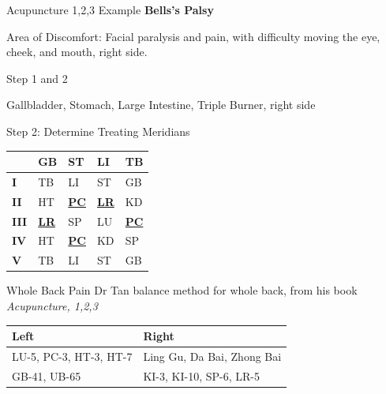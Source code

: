 \documentclass{beamer}
\begin{document}
\begin{frame}{Acupuncture 1,2,3 Example}
  \textbf{\LARGE{Bells's Palsy}}

  Area of Discomfort: Facial paralysis and pain, with difficulty moving the eye, cheek, and mouth, right side.
\end{frame}

\begin{frame}{Step 1 and 2}
  \begin{s1}
    Gallbladder, Stomach, Large Intestine, Triple Burner, right side
  \end{s1}

  Step 2: Determine Treating Meridians

  \begin{table}[]
    \begin{tabular}{@{}lllll@{}}
      \toprule
      & GB                & ST                & LI                & TB                \\ \midrule
      \textbf{I}   & TB                & LI                & ST                & GB                \\
      \textbf{II}  & HT                & {\ul \textbf{PC}} & {\ul \textbf{LR}} & KD                \\
      \textbf{III} & {\ul \textbf{LR}} & SP                & LU                & {\ul \textbf{PC}} \\
      \textbf{IV}  & HT                & {\ul \textbf{PC}} & KD                & SP                \\
      \textbf{V}   & TB                & LI                & ST                & GB                \\ \bottomrule
    \end{tabular}
  \end{table}
\end{frame}

\begin{frame}{Whole Back Pain}
  \Large Dr Tan balance method for whole back, from his book \textit{Acupuncture, 1,2,3}

  \begin{table}[]
    \begin{tabular}{@{}ll@{}}
      \toprule
      Left                   & Right                      \\ \midrule
      LU-5, PC-3, HT-3, HT-7 & Ling Gu, Da Bai, Zhong Bai \\
      GB-41, UB-65           & KI-3, KI-10, SP-6, LR-5    \\ \bottomrule
    \end{tabular}
  \end{table}

\end{frame}
\end{document}
